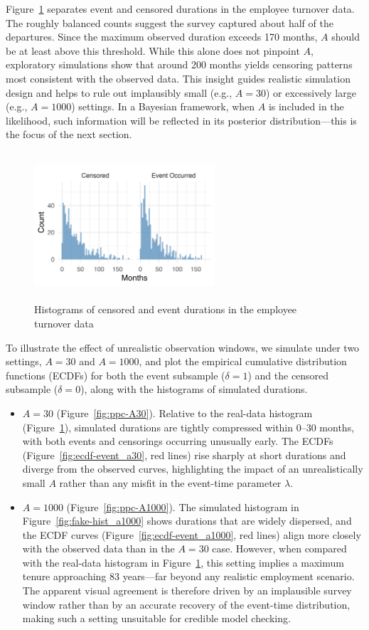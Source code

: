 Figure~\ref{fig:离职数据分开的直方图} separates event and censored durations in the employee turnover data. The roughly balanced counts suggest the survey captured about half of the departures. Since the maximum observed duration exceeds 170 months, $A$ should be at least above this threshold. While this alone does not pinpoint $A$, exploratory simulations show that around 200 months yields censoring patterns most consistent with the observed data. This insight guides realistic simulation design and helps to rule out implausibly small (e.g., $A=30$) or excessively large (e.g., $A=1000$) settings. In a Bayesian framework, when $A$ is included in the likelihood, such information will be reflected in its posterior distribution—this is the focus of the next section.
\begin{figure}[H]
    \centering
    \includegraphics[height=5.5cm, width=0.6\textwidth]{images/separate_hist.png}
    \caption{{\small Histograms of censored and event durations in the employee turnover data}}
    \label{fig:离职数据分开的直方图}
\end{figure}
To illustrate the effect of unrealistic observation windows, we simulate under two settings, $A = 30$ and $A = 1000$, and plot the empirical cumulative distribution functions (ECDFs) for both the event subsample ($\delta = 1$) and the censored subsample ($\delta = 0$), along with the histograms of simulated durations.
\begin{itemize}
    \item $A = 30$ (Figure~\ref{fig:ppc-A30}). Relative to the real-data histogram (Figure~\ref{fig:离职数据分开的直方图}), simulated durations are tightly compressed within 0–30 months, with both events and censorings occurring unusually early. The ECDFs (Figure~\ref{fig:ecdf-event_a30}, red lines) rise sharply at short durations and diverge from the observed curves, highlighting the impact of an unrealistically small $A$ rather than any misfit in the event-time parameter $\lambda$.
    \item $A = 1000$ (Figure~\ref{fig:ppc-A1000}). The simulated histogram in Figure~\ref{fig:fake-hist_a1000} shows durations that are widely dispersed, and the ECDF curves (Figure~\ref{fig:ecdf-event_a1000}, red lines) align more closely with the observed data than in the $A=30$ case. However, when compared with the real-data histogram in Figure~\ref{fig:离职数据分开的直方图}, this setting implies a maximum tenure approaching 83 years—far beyond any realistic employment scenario. The apparent visual agreement is therefore driven by an implausible survey window rather than by an accurate recovery of the event-time distribution, making such a setting unsuitable for credible model checking.
\end{itemize}
